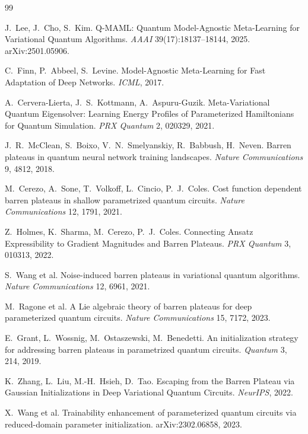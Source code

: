 \documentclass[11pt]{article}
\begin{document}

\begin{thebibliography}{99}

 J.~Lee, J.~Cho, S.~Kim. Q-MAML: Quantum Model-Agnostic Meta-Learning for Variational
Quantum Algorithms. \emph{AAAI} 39(17):18137--18144, 2025. arXiv:2501.05906.

 C.~Finn, P.~Abbeel, S.~Levine. Model-Agnostic Meta-Learning for Fast Adaptation of
Deep Networks. \emph{ICML}, 2017.

 A.~Cervera-Lierta, J.~S.~Kottmann, A.~Aspuru-Guzik. Meta-Variational
Quantum Eigensolver: Learning Energy Profiles of Parameterized Hamiltonians for Quantum Simulation.
\emph{PRX Quantum} 2, 020329, 2021.

 J.~R.~McClean, S.~Boixo, V.~N.~Smelyanskiy, R.~Babbush, H.~Neven. Barren
plateaus in quantum neural network training landscapes. \emph{Nature Communications} 9, 4812, 2018.

 M.~Cerezo, A.~Sone, T.~Volkoff, L.~Cincio, P.~J.~Coles. Cost function
dependent barren plateaus in shallow parametrized quantum circuits. \emph{Nature Communications} 12, 1791,
2021.

 Z.~Holmes, K.~Sharma, M.~Cerezo, P.~J.~Coles. Connecting Ansatz
Expressibility to Gradient Magnitudes and Barren Plateaus. \emph{PRX Quantum} 3, 010313, 2022.

 S.~Wang et al. Noise-induced barren plateaus in variational quantum algorithms.
\emph{Nature Communications} 12, 6961, 2021.

 M.~Ragone et al. A Lie algebraic theory of barren plateaus for deep parameterized
quantum circuits. \emph{Nature Communications} 15, 7172, 2023.

 E.~Grant, L.~Wossnig, M.~Ostaszewski, M.~Benedetti. An initialization
strategy for addressing barren plateaus in parametrized quantum circuits. \emph{Quantum} 3, 214, 2019.

 K.~Zhang, L.~Liu, M.-H.~Hsieh, D.~Tao. Escaping from the Barren Plateau via
Gaussian Initializations in Deep Variational Quantum Circuits. \emph{NeurIPS}, 2022.

 X.~Wang et al. Trainability enhancement of parameterized quantum circuits
via reduced-domain parameter initialization. arXiv:2302.06858, 2023.


\end{thebibliography}
\end{document}
